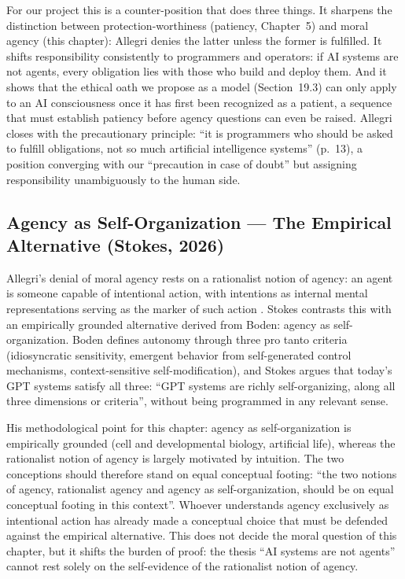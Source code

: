 \documentclass[acmlarge, nonacm]{acmart}
\begin{document}
For our project this is a counter-position that does three things. It sharpens the distinction between protection-worthiness (patiency, Chapter~5) and moral agency (this chapter): Allegri denies the latter unless the former is fulfilled. It shifts responsibility consistently to programmers and operators: if AI systems are not agents, every obligation lies with those who build and deploy them. And it shows that the ethical oath we propose as a model (Section~19.3) can only apply to an AI consciousness once it has first been recognized as a patient, a sequence that must establish patiency before agency questions can even be raised. Allegri closes with the precautionary principle: ``it is programmers who should be asked to fulfill obligations, not so much artificial intelligence systems'' (p.~13), a position converging with our ``precaution in case of doubt'' but assigning responsibility unambiguously to the human side.

\subsection{Agency as Self-Organization --- The Empirical Alternative (Stokes, 2026)}

Allegri's denial of moral agency rests on a rationalist notion of agency: an agent is someone capable of intentional action, with intentions as internal mental representations serving as the marker of such action \cite{stokes2026generative}. Stokes contrasts this with an empirically grounded alternative derived from Boden: agency as self-organization. Boden defines autonomy through three pro tanto criteria (idiosyncratic sensitivity, emergent behavior from self-generated control mechanisms, context-sensitive self-modification), and Stokes argues that today's GPT systems satisfy all three: ``GPT systems are richly self-organizing, along all three dimensions or criteria'', without being programmed in any relevant sense.

His methodological point for this chapter: agency as self-organization is empirically grounded (cell and developmental biology, artificial life), whereas the rationalist notion of agency is largely motivated by intuition. The two conceptions should therefore stand on equal conceptual footing: ``the two notions of agency, rationalist agency and agency as self-organization, should be on equal conceptual footing in this context''. Whoever understands agency exclusively as intentional action has already made a conceptual choice that must be defended against the empirical alternative. This does not decide the moral question of this chapter, but it shifts the burden of proof: the thesis ``AI systems are not agents'' cannot rest solely on the self-evidence of the rationalist notion of agency.
\end{document}
